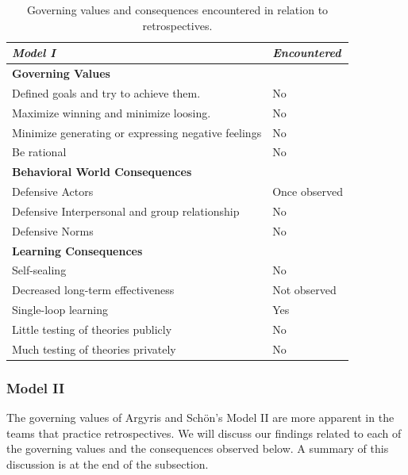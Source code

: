 \begin{table}[h]
	\begin{center}
		\caption{Governing values and consequences encountered in relation to retrospectives.}
		\label{table:model-i-occurences}
		\begin{tabular}{l l}
			\hline
			\textit{Model I} & \textit{Encountered} \\
			\hline
			\textbf{Governing Values} & \\
			Defined goals and try to achieve them. & No \\
			Maximize winning and minimize loosing. & No \\
			Minimize generating or expressing negative feelings & No \\
			Be rational & No \\
			\hline
			\textbf{Behavioral World Consequences} & \\
			Defensive Actors & Once observed \\
			Defensive Interpersonal and group relationship & No \\
			Defensive Norms & No \\
			\hline
			\textbf{Learning Consequences} & \\
			Self-sealing & No \\
			Decreased long-term effectiveness & Not observed \\
			Single-loop learning & Yes \\
			Little testing of theories publicly & No \\
			Much testing of theories privately & No \\
			\hline
		\end{tabular}
	\end{center}
\end{table}

\subsubsection{Model II}
The governing values of Argyris and Schön's Model II are more apparent in the teams that practice retrospectives. We will discuss our findings related to each of the governing values and the consequences observed below. A summary of this discussion is at the end of the subsection. 


